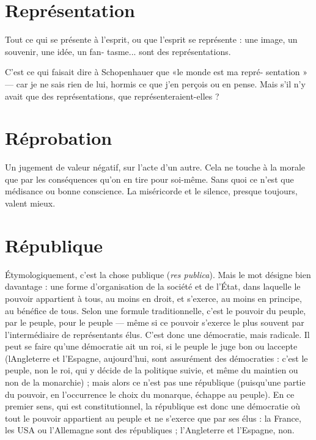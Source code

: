 \section{Représentation}
Tout ce qui se présente à l'esprit, ou que l'esprit se
représente : une image, un souvenir, une idée, un fan-
tasme... sont des représentations.

C’est ce qui faisait dire à Schopenhauer que «le monde est ma repré-
sentation » — car je ne sais rien de lui, hormis ce que j’en perçois ou en pense.
Mais s’il n’y avait que des représentations, que représenteraient-elles ?

\section{Réprobation}
Un jugement de valeur négatif, sur l’acte d’un autre. Cela
ne touche à la morale que par les conséquences qu’on en
tire pour soi-même. Sans quoi ce n’est que médisance ou bonne conscience. La
miséricorde et le silence, presque toujours, valent mieux.

\section{République}
Étymologiquement, c’est la chose publique ({\it res publica}). Mais
le mot désigne bien davantage : une forme d’organisation de
la société et de l’État, dans laquelle le pouvoir appartient à tous, au moins en
droit, et s'exerce, au moins en principe, au bénéfice de tous. Selon une formule
traditionnelle, c’est le pouvoir du peuple, par le peuple, pour le peuple — même
si ce pouvoir s'exerce le plus souvent par l’intermédiaire de représentants élus.
C’est donc une démocratie, mais radicale. Il peut se faire qu’une démocratie ait
un roi, si le peuple le juge bon ou laccepte (lAngleterre et l’Espagne,
aujourd’hui, sont assurément des démocraties : c’est le peuple, non le roi, qui y
décide de la politique suivie, et même du maintien ou non de la monarchie) ;
mais alors ce n’est pas une république (puisqu’une partie du pouvoir, en
l'occurrence le choix du monarque, échappe au peuple). En ce premier sens,
qui est constitutionnel, la république est donc une démocratie où tout le pouvoir
appartient au peuple et ne s’exerce que par ses élus : la France, les USA ou
l’Allemagne sont des républiques ; l'Angleterre et l'Espagne, non.

